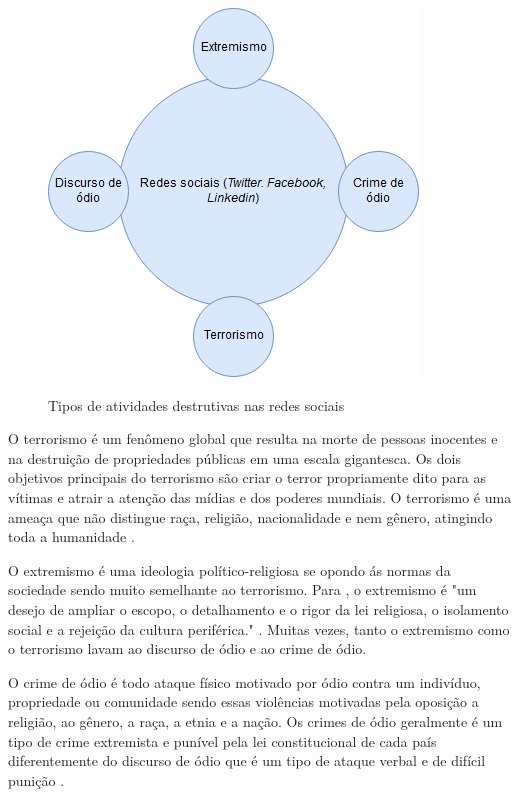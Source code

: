 \begin{figure}[!h]
\centering 
\caption{Tipos de atividades destrutivas nas redes sociais}
\includegraphics[scale=0.70]{imagens/atividadesdestrutivas.png}
\label{fig:atividadesdestrutivas}
\end{figure}

O terrorismo é um fenômeno global que resulta na morte de pessoas inocentes e na destruição de propriedades públicas em uma escala gigantesca. Os dois objetivos principais do terrorismo são criar o terror propriamente dito para as vítimas e atrair a atenção das mídias e dos poderes mundiais. O terrorismo é uma ameaça que não distingue raça, religião, nacionalidade e nem gênero, atingindo toda a humanidade \cite{Chetty2018}.

O extremismo é uma ideologia político-religiosa se opondo ás normas da sociedade sendo muito semelhante ao terrorismo. Para , o extremismo é "um desejo de ampliar o escopo, o detalhamento e o rigor da lei religiosa, o isolamento social e a rejeição da cultura periférica." \cite{Liebman1983,Chetty2018}. Muitas vezes, tanto o extremismo como o terrorismo lavam ao discurso de ódio e ao crime de ódio.

O crime de ódio é todo ataque físico motivado por ódio contra um indivíduo, propriedade ou comunidade sendo essas violências motivadas pela oposição a religião, ao gênero, a raça, a etnia e a nação. Os crimes de ódio geralmente é um tipo de crime extremista e punível pela lei constitucional de cada país diferentemente do discurso de ódio que é um tipo de ataque verbal e de difícil punição \cite{Chetty2018}.

